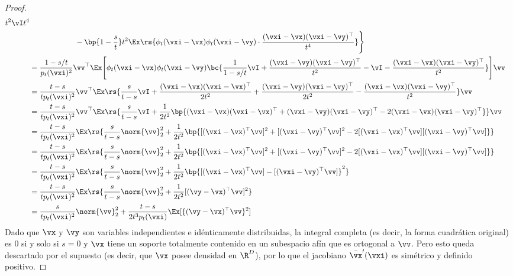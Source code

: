 \documentclass[../../book-main_es.tex]{subfiles}
\begin{document}
\begin{proof}
\begin{align}
{{            t^{2}\vI}{t^{4}}} \\
            & \qquad \qquad \qquad -\bp{1 -
            \frac{s}{t}}t^{2}\Ex\rs{\phi_{t}(\vxi - \vx)\phi_{t}(\vxi -
        \vy)\cdot\frac{(\vxi - \vx)(\vxi - \vy)^{\top}}{t^{4}}}\Bigg\} \\
        &= \frac{1 -
        s/t}{p_{t}(\vxi)^{2}}\vv^{\top}\Ex\mathopen{}\Bigg[\phi_{t}(\vxi
            - \vx)\phi_{t}(\vxi - \vy)\bc{\frac{1}{1 - s/t}\vI +
                \frac{(\vxi - \vy)(\vxi - \vy)^{\top}}{t^{2}} - \vI -
        \frac{(\vxi - \vx)(\vxi - \vy)^{\top}}{t^{2}}}\Bigg]\vv \\
        &= \frac{t - s}{tp_{t}(\vxi)^{2}}\vv^{\top}\Ex\rs{\frac{s}{t
            - s}\vI +\frac{(\vxi - \vx)(\vxi - \vx)^{\top}}{2t^{2}} +
            \frac{(\vxi - \vy)(\vxi - \vy)^{\top}}{2t^{2}} - \frac{(\vxi
        - \vx)(\vxi - \vy)^{\top}}{t^{2}}}\vv \\
        &= \frac{t - s}{tp_{t}(\vxi)^{2}}\vv^{\top}\Ex\rs{\frac{s}{t
            - s}\vI +\frac{1}{2t^{2}}\bp{(\vxi - \vx)(\vxi - \vx)^{\top}
                + (\vxi - \vy)(\vxi - \vy)^{\top} - 2(\vxi - \vx)(\vxi -
        \vy)^{\top}}}\vv \\
        &= \frac{t - s}{tp_{t}(\vxi)^{2}}\Ex\rs{\frac{s}{t -
            s}\norm{\vv}_{2}^{2} +\frac{1}{2t^{2}}\bp{[(\vxi -
                \vx)^{\top}\vv]^{2} + [(\vxi - \vy)^{\top}\vv]^{2} - 2[(\vxi
        - \vx)^{\top}\vv][(\vxi - \vy)^{\top}\vv]}} \\
        &= \frac{t - s}{tp_{t}(\vxi)^{2}}\Ex\rs{\frac{s}{t -
            s}\norm{\vv}_{2}^{2} +\frac{1}{2t^{2}}\bp{[(\vxi -
                \vx)^{\top}\vv]^{2} + [(\vxi - \vy)^{\top}\vv]^{2} - 2[(\vxi
        - \vx)^{\top}\vv][(\vxi - \vy)^{\top}\vv]}} \\
        &= \frac{t - s}{tp_{t}(\vxi)^{2}}\Ex\rs{\frac{s}{t -
            s}\norm{\vv}_{2}^{2} +\frac{1}{2t^{2}}\bp{[(\vxi -
        \vx)^{\top}\vv] - [(\vxi - \vy)^{\top}\vv]}^{2}} \\
        &= \frac{t - s}{tp_{t}(\vxi)^{2}}\Ex\rs{\frac{s}{t -
        s}\norm{\vv}_{2}^{2} +\frac{1}{2t^{2}}[(\vy - \vx)^{\top}\vv]^{2}} \\
        &= \frac{s}{tp_{t}(\vxi)^{2}}\norm{\vv}_{2}^{2} + \frac{t -
        s}{2t^{3}p_{t}(\vxi)}\Ex[\{(\vy - \vx)^{\top}\vv\}^{2}]
    \end{align}
    Dado que \(\vx\) y \(\vy\) son variables independientes e idénticamente distribuidas, la integral completa (es decir,
    la forma cuadrática original) es \(0\) si y solo si \(s = 0\)
    y \(\vx\) tiene un soporte totalmente contenido en un subespacio afín
    que es ortogonal a \(\vv\). Pero esto queda descartado por
    el supuesto (es decir, que \(\vx\) posee densidad en \(\R^{D}\)), por lo que
    el jacobiano \(\bar{\vx}^{\prime}(\vxi)\) es simétrico y definido positivo.
\end{proof}
\end{document}
